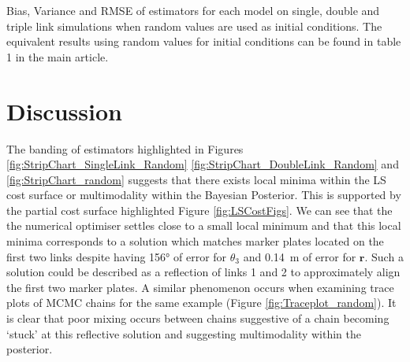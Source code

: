 \documentclass{article}
\begin{document}
\begin{table}
{}
\caption{Bias, Variance and RMSE of estimators for each model on single, double and triple link simulations when random values are used as initial conditions.  The equivalent results using random values for initial conditions can be found in table 1 in the main article.}
\label{tab:BiasVarianceRMSE_random}
\end{table}

\section{Discussion}
The banding of estimators highlighted in Figures \ref{fig:StripChart_SingleLink_Random} \ref{fig:StripChart_DoubleLink_Random} and \ref{fig:StripChart_random} suggests that there exists local minima within the LS cost surface or multimodality within the Bayesian Posterior.  This is supported by the partial cost surface highlighted Figure \ref{fig:LSCostFigs}.  We can see that the the numerical optimiser settles close to a small local minimum and that this local minima corresponds to a solution which matches marker plates located on the first two links despite having \ang{156} of error for $\theta_3$ and \SI{0.14}{\meter} of error for $\bm{r}$.  Such a solution could be described as a reflection of links 1 and 2 to approximately align the first two marker plates.  A similar phenomenon occurs when examining trace plots of MCMC chains for the same example (Figure \ref{fig:Traceplot_random}).  It is clear that poor mixing occurs between chains suggestive of a chain becoming `stuck' at this reflective solution and suggesting multimodality within the posterior.  
\end{document}
